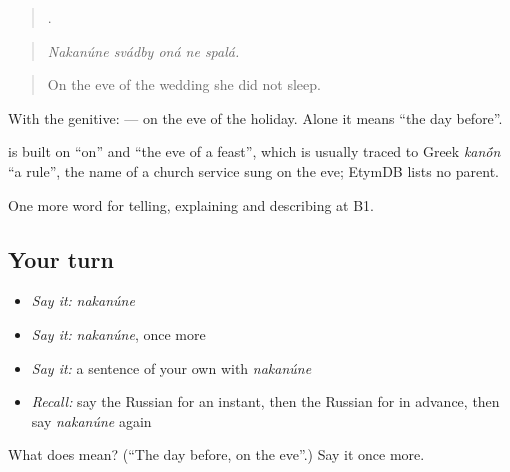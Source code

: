 \begin{quote}
    .
\end{quote}

\begin{quote}
\emph{Nakanúne svádby oná ne spalá.}
\end{quote}

\begin{quote}
On the eve of the wedding she did not sleep.
\end{quote}

With the genitive: \emph{ } — on the eve of the holiday. Alone it means \textquotedblleft{}the day before\textquotedblright{}.

\begin{cousinweb}
\emph{} is built on \emph{} \textquotedblleft{}on\textquotedblright{} and \emph{} \textquotedblleft{}the eve of a feast\textquotedblright{}, which is usually traced to Greek \emph{kan\'{\={o}}n} \textquotedblleft{}a rule\textquotedblright{}, the name of a church service sung on the eve; EtymDB lists no parent.
\end{cousinweb}

\begin{grammarlens}[title={What you've built}]
One more word for telling, explaining and describing at B1.
\end{grammarlens}

\subsection*{Your turn}
\begin{itemize}
\raggedright
  \item \emph{Say it:} \emph{nakanúne}
  \item \emph{Say it:} \emph{nakanúne}, once more
  \item \emph{Say it:} a sentence of your own with \emph{nakanúne}
  \item \emph{Recall:} say the Russian for an instant, then the Russian for in advance, then say \emph{nakanúne} again
\end{itemize}

\begin{tcolorbox}[breakable,colback=teal!4,colframe=teal!35!black,title={Before you move on}]
What does  mean? (\textquotedblleft{}The day before, on the eve\textquotedblright{}.) Say it once more.
\end{tcolorbox}

